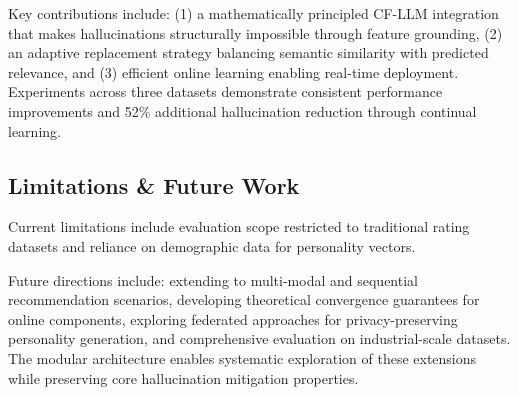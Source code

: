 \documentclass[acmsmall]{acmart}
\begin{document}
Key contributions include: (1) a mathematically principled CF-LLM integration that makes hallucinations structurally impossible through feature grounding, (2) an adaptive replacement strategy balancing semantic similarity with predicted relevance, and (3) efficient online learning enabling real-time deployment. Experiments across three datasets demonstrate consistent performance improvements and 52\% additional hallucination reduction through continual learning.

\subsection{Limitations \& Future Work}
Current limitations include evaluation scope restricted to traditional rating datasets and reliance on demographic data for personality vectors. 

Future directions include: extending to multi-modal and sequential recommendation scenarios, developing theoretical convergence guarantees for online components, exploring federated approaches for privacy-preserving personality generation, and comprehensive evaluation on industrial-scale datasets. The modular architecture enables systematic exploration of these extensions while preserving core hallucination mitigation properties.
\newpage
\appendix
\end{document}
